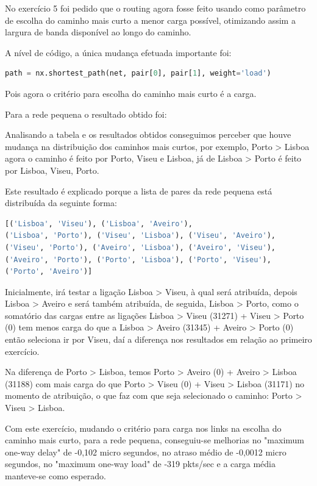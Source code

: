 \documentclass[pdftex,12pt,a4paper]{report}
\begin{document}
No exercício 5 foi pedido que o routing agora fosse feito usando como parâmetro de escolha do caminho mais curto a menor carga possível, otimizando assim a largura de banda disponível  ao longo do caminho.

A nível de código, a única mudança efetuada importante foi:
\begin{lstlisting}[language=python]
path = nx.shortest_path(net, pair[0], pair[1], weight='load')
\end{lstlisting}

Pois agora o critério para escolha do caminho mais curto é a carga.

Para a rede pequena o resultado obtido foi:



Analisando a tabela e os resultados obtidos conseguimos perceber que houve mudança na distribuição dos caminhos mais curtos, por exemplo, Porto > Lisboa agora o caminho é feito por Porto, Viseu e Lisboa, já de Lisboa > Porto é feito por Lisboa, Viseu, Porto.

Este resultado é explicado porque a lista de pares da rede pequena está distribuída da seguinte forma:

\begin{lstlisting}[language=python]
[('Lisboa', 'Viseu'), ('Lisboa', 'Aveiro'),
('Lisboa', 'Porto'), ('Viseu', 'Lisboa'), ('Viseu', 'Aveiro'),
('Viseu', 'Porto'), ('Aveiro', 'Lisboa'), ('Aveiro', 'Viseu'), 
('Aveiro', 'Porto'), ('Porto', 'Lisboa'), ('Porto', 'Viseu'),
('Porto', 'Aveiro')]
\end{lstlisting}

Inicialmente, irá testar a ligação Lisboa > Viseu, à qual será atribuída, depois Lisboa > Aveiro e será também atribuída, de seguida, Lisboa > Porto, como o somatório das cargas entre as ligações Lisboa > Viseu (31271) + Viseu > Porto (0) tem menos carga do que a Lisboa > Aveiro (31345) + Aveiro > Porto (0) então seleciona ir por Viseu, daí a diferença nos resultados em relação ao primeiro exercício.
 
Na diferença de Porto > Lisboa, temos Porto > Aveiro (0)  + Aveiro > Lisboa (31188) com mais carga do que Porto > Viseu (0) + Viseu > Lisboa (31171) no momento de atribuição, o que faz com que seja selecionado o caminho: Porto > Viseu > Lisboa.





Com este exercício, mudando o critério para carga nos links na escolha do caminho mais curto, para a rede pequena, conseguiu-se melhorias no "maximum one-way delay" de -0,102 micro segundos, no atraso médio de -0,0012 micro segundos, no "maximum one-way load" de -319 pkts/sec e a carga média manteve-se como esperado.
\end{document}
